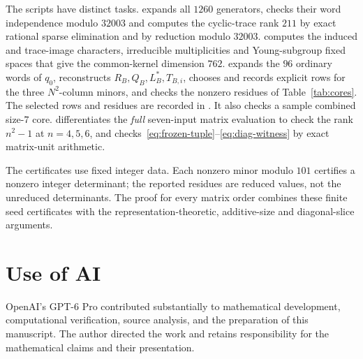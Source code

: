 \documentclass[11pt,reqno]{amsart}
\theoremstyle{definition}
\begin{document}
The scripts have distinct tasks.   expands all $1260$ generators, checks their word independence modulo $32003$ and computes the cyclic-trace rank $211$ by exact rational sparse elimination and by reduction modulo $32003$.   computes the induced and trace-image characters, irreducible multiplicities and Young-subgroup fixed spaces that give the common-kernel dimension $762$.   expands the $96$ ordinary words of $q_0$, reconstructs $R_B,Q_B,L_B^*,T_{B,i}$, chooses and records explicit rows for the three $N^2$-column minors, and checks the nonzero residues of Table~\ref{tab:cores}.  The selected rows and residues are recorded in .  It also checks a sample combined size-$7$ core.   differentiates the \emph{full} seven-input matrix evaluation to check the rank $n^2-1$ at $n=4,5,6$, and  checks~\eqref{eq:frozen-tuple}--\eqref{eq:diag-witness} by exact matrix-unit arithmetic.

The certificates use fixed integer data.  Each nonzero minor modulo $101$ certifies a nonzero integer determinant; the reported residues are reduced values, not the unreduced determinants.  The proof for every matrix order combines these finite seed certificates with the representation-theoretic, additive-size and diagonal-slice arguments.

\section*{Use of AI}
OpenAI's GPT-6 Pro contributed substantially to mathematical development, computational verification, source analysis, and the preparation of this manuscript.  The author directed the work and retains responsibility for the mathematical claims and their presentation.



\end{document}
